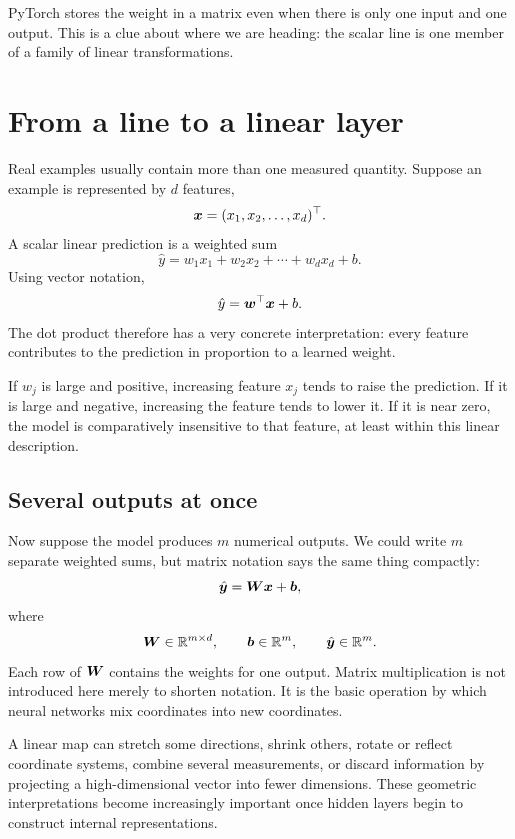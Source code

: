 PyTorch stores the weight in a matrix even when there is only one input and one output. This is a clue about where we are heading: the scalar line is one member of a family of linear transformations.

\section{From a line to a linear layer}

Real examples usually contain more than one measured quantity. Suppose an example is represented by \(d\) features,
\[
  \bm{x} = (x_1,x_2,\ldots,x_d)^\top.
\]
A scalar linear prediction is a weighted sum
\begin{equation}
  \hat y = w_1x_1+w_2x_2+\cdots+w_dx_d+b.
\end{equation}
Using vector notation,
\begin{equation}
  \hat y = \bm{w}^{\top}\bm{x}+b.
  \label{eq:week2-dot}
\end{equation}
The dot product therefore has a very concrete interpretation: every feature contributes to the prediction in proportion to a learned weight.

If \(w_j\) is large and positive, increasing feature \(x_j\) tends to raise the prediction. If it is large and negative, increasing the feature tends to lower it. If it is near zero, the model is comparatively insensitive to that feature, at least within this linear description.

\subsection{Several outputs at once}

Now suppose the model produces \(m\) numerical outputs. We could write \(m\) separate weighted sums, but matrix notation says the same thing compactly:
\begin{equation}
  \hat{\bm{y}} = \bm{W}\bm{x}+\bm{b},
  \label{eq:week2-linear-map}
\end{equation}
where
\[
  \bm{W}\in\mathbb{R}^{m\times d}, \qquad
  \bm{b}\in\mathbb{R}^m, \qquad
  \hat{\bm{y}}\in\mathbb{R}^m.
\]
Each row of \(\bm{W}\) contains the weights for one output. Matrix multiplication is not introduced here merely to shorten notation. It is the basic operation by which neural networks mix coordinates into new coordinates.

A linear map can stretch some directions, shrink others, rotate or reflect coordinate systems, combine several measurements, or discard information by projecting a high-dimensional vector into fewer dimensions. These geometric interpretations become increasingly important once hidden layers begin to construct internal representations.

